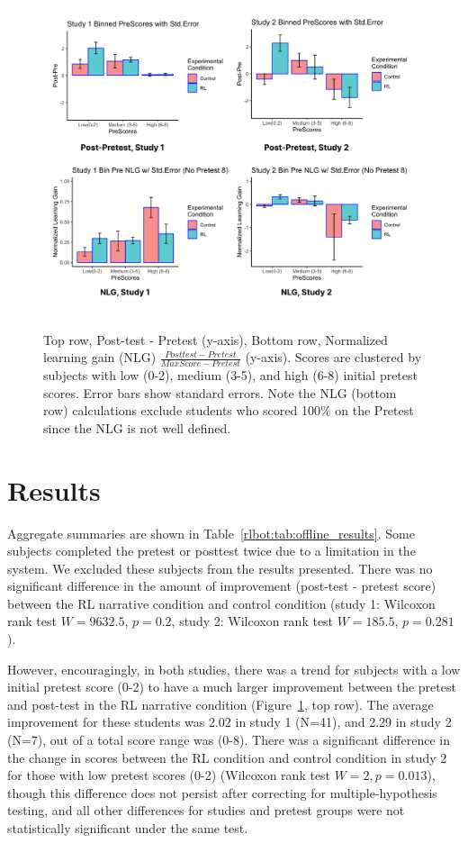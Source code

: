 \documentclass[sn-mathphys,Numbered]{sn-jnl}%
\theoremstyle{thmstyleone}%
\theoremstyle{thmstyletwo}%
\theoremstyle{thmstylethree}%
\begin{document}
\begin{figure}[tb]
\centering
 \includegraphics[height=4.0in]{Figures/Figure4.pdf}
 \caption{Top row,  Post-test - Pretest (y-axis), Bottom row, Normalized learning gain (NLG) $\frac{Post test - Pretest}{MaxScore - Pretest}$ (y-axis). Scores are clustered by subjects with low (0-2), medium (3-5), and high (6-8) initial pretest scores. Error bars show standard errors. Note the NLG (bottom row) calculations exclude students who scored 100\% on the Pretest since the NLG is not well defined.}
      \label{rlbot:fig:improve_by_pre_study}
 \end{figure}



\section{Results}\label{sec3}

Aggregate summaries are shown in Table~\ref{rlbot:tab:offline_results}. Some subjects completed the pretest or posttest twice due to a limitation in the system. We excluded these subjects from the results presented. There was no significant difference in the amount of improvement (post-test - pretest score) between the RL narrative condition and control condition (study 1: Wilcoxon rank test $W = 9632.5$, $p = 0.2$, study 2: Wilcoxon rank test $W = 185.5$, $p = 0.281$).   
 
 However, encouragingly, in both studies, there was a trend for subjects with a low initial pretest score (0-2) to have a much larger improvement between the pretest and post-test in the RL narrative condition (Figure~\ref{rlbot:fig:improve_by_pre_study}, top row). The average improvement for these students was 2.02 in study 1 (N=41), and 2.29 in study 2 (N=7), out of a total score range was (0-8). There was a significant difference in the change in scores between the RL condition and control condition in study 2 for those with low pretest scores (0-2) (Wilcoxon rank test $W=2, p=0.013$), though this difference does not persist after correcting for multiple-hypothesis testing, and all other differences for studies and pretest groups were not statistically significant under the same test.  %
 
\end{document}
